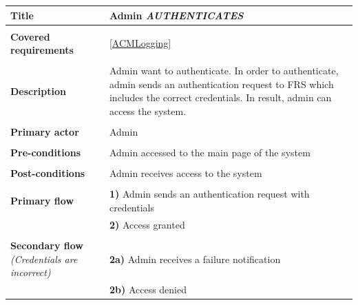 \documentclass[a4paper,11pt]{article}
\begin{document}
\begin{tabular}{|p{3.5cm}|p{11.5cm}|} \hline
    \textbf{Title} &   Admin \emph{AUTHENTICATES}

    \\ \hline \rowcolor{Gray} & \\ \hline

    \textbf{Covered requirements} &  \ref{ACMLogging}
  
    \\ \hline \rowcolor{Gray} & \\ \hline 
  
    \textbf{Description} &  Admin want to authenticate. In order to authenticate, admin sends an authentication request to FRS which includes the correct credentials. In result, admin can access the system. 
   
    \\ \hline \rowcolor{Gray} & \\ \hline 
   
    \textbf{Primary actor} & Admin   
   
    \\ \hline \rowcolor{Gray} & \\ \hline  
   
    \textbf{Pre-conditions} &   Admin accessed to the main page of the system 
   
    \\ \hline \rowcolor{Gray} & \\ \hline 
   
    \textbf{Post-conditions} &   Admin receives access to the system 
   
    \\ \hline \rowcolor{Gray} & \\ \hline  
   
    \textbf{Primary flow} &  
    \textbf{1)} Admin sends an authentication request with credentials  \\& 
    \textbf{2)} Access granted
    
    \\ \hline \rowcolor{Gray} & \\ \hline  
   
    \textbf{Secondary flow} \emph{(Credentials are incorrect)} &  
    \textbf{2a)} Admin receives a failure notification \\ &
    \textbf{2b)} Access denied
    
    \\ \hline   
\end{tabular}
\end{document}
